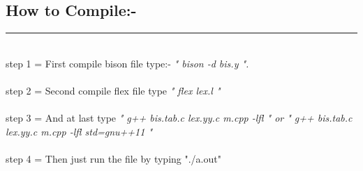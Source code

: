 \documentclass{article}
\begin{document}
\begin{huge}
\section{How to Compile:-}
\noindent
{\color{red} \rule{\linewidth}{0.2mm} }
\end{huge}
\\
step 1 = First compile bison file type:- \textit{" bison -d bis.y  ".}
\\
\\  step 2 = Second compile flex file type \textit{" flex lex.l "}
\\
\\  step 3 = And at last type \textit{" g++ bis.tab.c lex.yy.c m.cpp -lfl " or "  g++ bis.tab.c lex.yy.c m.cpp -lfl std=gnu++11 "}
\\
\\ step 4 = Then just run the file by typing "./a.out"
\end{document}
